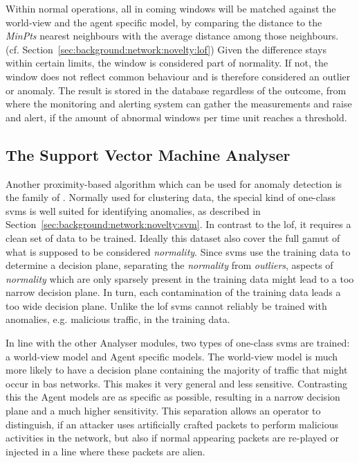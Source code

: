 Within normal operations, all in coming windows will be matched against the world-view and the agent specific model, by comparing the distance to the \emph{MinPts} nearest neighbours with the average distance among those neighbours. (cf. Section~\ref{sec:background:network:novelty:lof})
Given the difference stays within certain limits, the window is considered part of normality. If not, the window does not reflect common behaviour and is therefore considered an outlier or anomaly.
The result is stored in the database regardless of the outcome, from where the monitoring and alerting system can gather the measurements and raise and alert, if the amount of abnormal windows per time unit reaches a threshold.

\subsection{The Support Vector Machine Analyser}
\label{sec:concept:anal:svm}

Another proximity-based algorithm which can be used for anomaly detection is the family of . Normally used for clustering data, the special kind of one-class \glspl{svm} is well suited for identifying anomalies, as described in Section~\ref{sec:background:network:novelty:svm}.
In contrast to the \gls{lof}, it requires a clean set of data to be trained. Ideally this dataset also cover the full gamut of what is supposed to be considered \emph{normality}.
Since \glspl{svm} use the training data to determine a decision plane, separating the \emph{normality} from \emph{outliers}, aspects of \emph{normality} which are only sparsely present in the training data might lead to a too narrow decision plane.
In turn, each contamination of the training data leads a too wide decision plane.
Unlike the \gls{lof} \glspl{svm} cannot reliably be trained with anomalies, e.g. malicious traffic, in the training data.

In line with the other Analyser modules, two types of one-class \glspl{svm} are trained: a world-view model and Agent specific models.
The world-view model is much more likely to have a decision plane containing the majority of traffic that might occur in \gls{bas} networks.
This makes it very general and less sensitive.
Contrasting this the Agent models are as specific as possible, resulting in a narrow decision plane and a much higher sensitivity.
This separation allows an operator to distinguish, if an attacker uses artificially crafted packets to perform malicious activities in the network, but also if normal appearing packets are re-played or injected in a line where these packets are alien.

